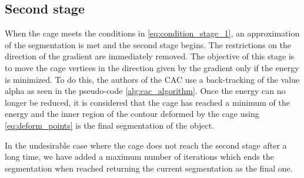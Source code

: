 \subsection*{Second stage}

When the cage meets the conditions in \eqref{eq:condition_stage_1}, an approximation of the segmentation is met and the second stage begins. The restrictions on the direction of the gradient are immediately removed. The objective of this stage is to move the cage vertices in the direction given by the gradient only if the energy is minimized. To do this, the authors of the CAC use a back-tracking of the value alpha as seen in the pseudo-code \ref{alg:cac_algorithm}. Once the energy can no longer be reduced, it is considered that the cage has reached a minimum of the energy and the inner region of the contour deformed by the cage using \eqref{eq:deform_points} is the final segmentation of the object. 

In the undesirable case where the cage does not reach the second stage after a long time, we have added a maximum number of iterations which ends the segmentation when reached returning the current segmentation as the final one.
